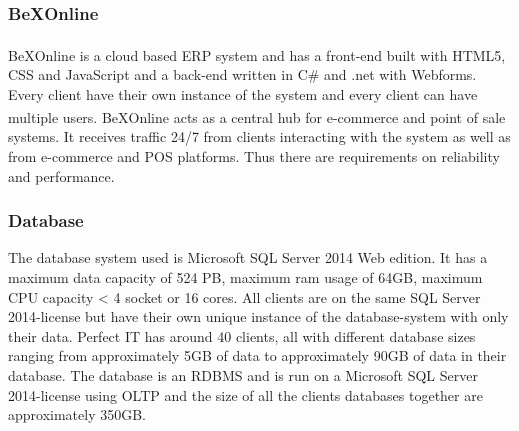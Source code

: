 \documentclass{cslthse-msc}
\newcommand{\bex}{BeX\textsuperscript{\textregistered}}
\begin{document}
\subsubsection{\bex Online}
\bex Online is a cloud based ERP system and has a front-end built with HTML5, CSS and JavaScript and a back-end written in C\# and .net with Webforms.
Every client have their own instance of the system and every client can have multiple users. \bex Online acts as a central hub for e-commerce and point of sale systems. It receives traffic 24/7 from clients interacting with the system as well as from e-commerce and POS platforms. Thus there are requirements on reliability and performance.

\subsubsection{Database}
The database system used is Microsoft SQL Server 2014 Web edition. It has a maximum data capacity of 524 PB, maximum ram usage of 64GB, maximum CPU capacity < 4 socket or 16 cores. All clients are on the same SQL Server 2014-license but have their own unique instance of the database-system with only their data.  Perfect IT has around 40 clients, all with different database sizes ranging from approximately 5GB of data to approximately 90GB of data in their database. The database is an RDBMS and is run on a Microsoft SQL Server 2014-license using OLTP and the size of all the clients databases together are approximately 350GB.
\end{document}
